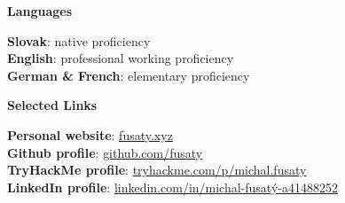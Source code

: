 \documentclass[12pt]{article}
\begin{document}

\begin{center}
	{\noindent \bfseries Languages}
\end{center} 

\vspace{0.12pt}

\noindent
{\bfseries Slovak}: native proficiency \\[0.04in]
{\bfseries English}: professional working proficiency \\[0.04in]
{\bfseries German \& French}: elementary proficiency \\[0.04in]

\vspace{0.12pt} %

\begin{center}
	{\noindent \bfseries Selected Links}
\end{center} 

\vspace{0.1pt}

\noindent
{\bfseries Personal website}:
\href{https://fusaty.xyz/}{fusaty.xyz} \\[0.04in]
{\bfseries Github profile}: \href{https://github.com/fusaty}{github.com/fusaty} \\[0.04in]
{\bfseries TryHackMe profile}: \href{https://tryhackme.com/p/michal.fusaty}{tryhackme.com/p/michal.fusaty} \\[0.04in]
{\bfseries LinkedIn profile}: \href{https://linkedin.com/in/michal-fusatý-a41488252}{linkedin.com/in/michal-fusatý-a41488252} \\[0.04in]




\end{document}

